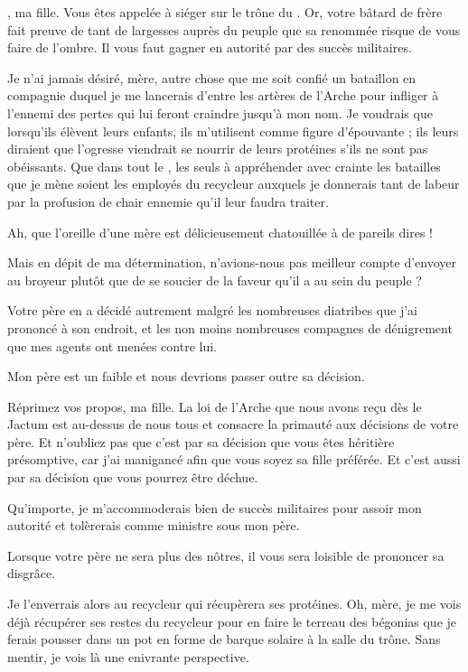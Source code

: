 \begin{drama}
  \reinespeaks \princesse, ma fille. Vous êtes appelée à siéger sur le trône du \campprincipal{}. Or, votre bâtard de frère fait preuve de tant de largesses auprès du peuple que sa renommée risque de vous faire de l’ombre. Il vous faut gagner en autorité par des succès militaires.

  \princessespeaks Je n’ai jamais désiré, mère, autre chose que me soit confié un bataillon en compagnie duquel je me lancerais d’entre les artères de l’Arche pour infliger à l’ennemi des pertes qui lui feront craindre jusqu’à mon nom. Je voudrais que lorsqu’ils élèvent leurs enfants, ils m’utilisent comme figure d’épouvante ; ils leurs diraient que \princesse{}  l’ogresse viendrait se nourrir de leurs protéines s’ils ne sont pas obéissants. Que dans tout le \campprincipal{}, les seuls à appréhender avec crainte les batailles que je mène soient les employés du recycleur auxquels je donnerais tant de labeur par la profusion de chair ennemie qu’il leur faudra traiter.

  \reinespeaks Ah, que l’oreille d’une mère est délicieusement chatouillée à de pareils dires !

  \princessespeaks Mais en dépit de ma détermination, n’avions-nous pas meilleur compte d’envoyer \elena{} au broyeur plutôt que de se soucier de la faveur qu’il a au sein du peuple ?

  \reinespeaks Votre père en a décidé autrement malgré les nombreuses diatribes que j’ai prononcé à son endroit, et les non moins nombreuses compagnes de dénigrement que mes agents ont menées contre lui.

  \princessespeaks Mon père est un faible et nous devrions passer outre sa décision.

  \reinespeaks Réprimez vos propos, ma fille. La loi de l’Arche que nous avons reçu dès le Jactum est au-dessus de nous tous et consacre la primauté aux décisions de votre père. Et n’oubliez pas que c’est par sa décision que vous êtes héritière présomptive, car j’ai manigancé afin que vous soyez sa fille préférée. Et c’est aussi par sa décision que vous pourrez être déchue.

  \princessespeaks Qu’importe, je m’accommoderais bien de succès militaires pour assoir mon autorité et tolèrerais \elena{} comme ministre sous mon père.

  \reinespeaks Lorsque votre père ne sera plus des nôtres, il vous sera loisible de prononcer sa disgrâce.

  \princessespeaks Je %
  l’enverrais alors au recycleur qui récupèrera ses protéines. Oh, mère, je me vois déjà récupérer ses restes du recycleur pour en faire le terreau des bégonias que je ferais pousser dans un pot en forme de barque solaire à la salle du trône. Sans mentir, je vois là une enivrante perspective.


\end{drama}

